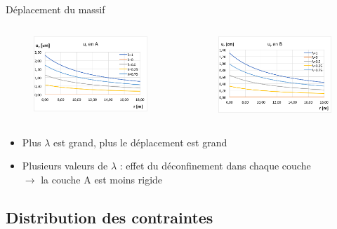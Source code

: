 \documentclass{beamer}
\begin{document}
\begin{frame}{Déplacement du massif}
    
    \begin{columns}
    \begin{column}{0.5\textwidth}
\begin{figure}
\centering
\includegraphics[width=5.5cm]{ur_A.png}
\end{figure}
    \end{column}
    
    \begin{column}{0.5\textwidth}
\begin{figure}
\centering
\includegraphics[width=5.5cm]{ur_B.png}
\end{figure}
    \end{column}
    \end{columns}
    
\begin{itemize}
    \item Plus $\lambda$ est grand, plus le déplacement est grand
    
    \item Plusieurs valeurs de $\lambda$ : effet du déconfinement dans chaque couche\\ $\rightarrow$ la couche A est moins rigide
\end{itemize}
\end{frame}

\subsection{Distribution des contraintes}
\end{document}
